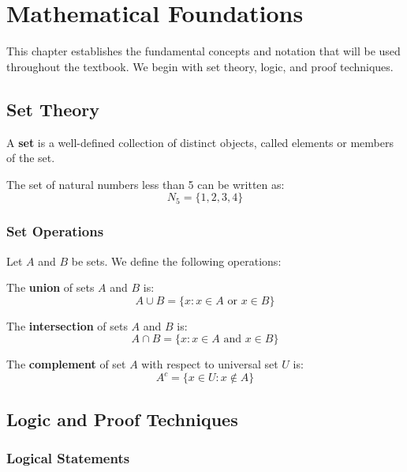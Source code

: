 \chapter{Mathematical Foundations}

This chapter establishes the fundamental concepts and notation that will be used throughout the textbook. We begin with set theory, logic, and proof techniques.

\section{Set Theory}

\begin{definition}[Set]
A \textbf{set} is a well-defined collection of distinct objects, called elements or members of the set.
\end{definition}

\begin{example}
The set of natural numbers less than 5 can be written as:
\[N_5 = \{1, 2, 3, 4\}\]
\end{example}

\subsection{Set Operations}

Let $A$ and $B$ be sets. We define the following operations:

\begin{definition}[Union]
The \textbf{union} of sets $A$ and $B$ is:
\[A \cup B = \{x : x \in A \text{ or } x \in B\}\]
\end{definition}

\begin{definition}[Intersection]
The \textbf{intersection} of sets $A$ and $B$ is:
\[A \cap B = \{x : x \in A \text{ and } x \in B\}\]
\end{definition}

\begin{definition}[Complement]
The \textbf{complement} of set $A$ with respect to universal set $U$ is:
\[A^c = \{x \in U : x \notin A\}\]
\end{definition}

\section{Logic and Proof Techniques}

\subsection{Logical Statements}

